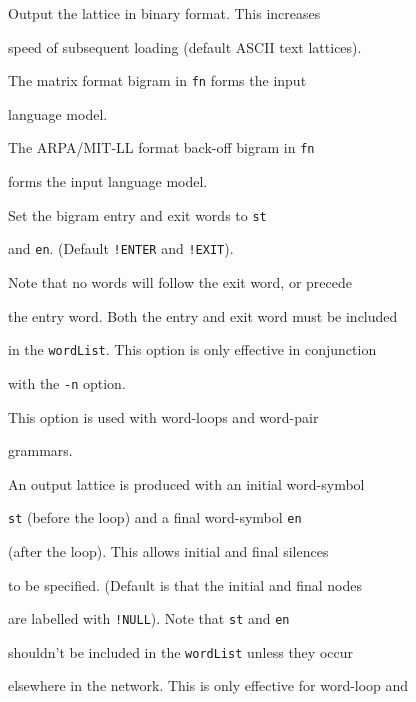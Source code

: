 \begin{optlist}


   Output the lattice in binary format. This increases


              speed of subsequent loading (default ASCII text lattices).





   The matrix format bigram in {\tt fn} forms the input


              language model.





   The ARPA/MIT-LL format back-off bigram in {\tt fn} 


              forms the input language model.





   Set the bigram entry and exit words to {\tt st} 


        and {\tt en}.  (Default {\tt !ENTER} and {\tt !EXIT}).


        Note that no words will follow the exit word, or precede


        the entry word. Both the entry and exit word must be included


        in the {\tt wordList}. This option is only effective in conjunction


          with the \texttt{-n} option.





   This option is used with word-loops and word-pair 


        grammars.


        An output lattice is produced with an initial word-symbol


        {\tt st} (before the loop) and a final word-symbol {\tt en}


        (after the loop). This allows initial and final silences


        to be specified. (Default is that the initial and final nodes


        are labelled with {\tt !NULL}). Note that {\tt st} and {\tt en} 


        shouldn't be included in the {\tt wordList} unless they occur 


        elsewhere in the network. This is only effective for word-loop and



\end{optlist}
